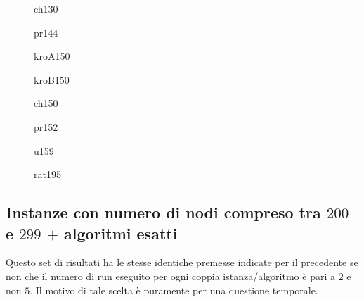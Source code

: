 \documentclass[11pt]{article}
\begin{document}
\begin{figure}[htbp]
\centering
{}
\label{fig:ch130}
\caption{ch130}
\end{figure}

\begin{figure}[htbp]
\centering
{}
\label{fig:pr144}
\caption{pr144}
\end{figure}

\begin{figure}[htbp]
\centering
{}
\label{fig:kroA150}
\caption{kroA150}
\end{figure}

\begin{figure}[htbp]
\centering
{}
\label{fig:kroB150}
\caption{kroB150}
\end{figure}

\begin{figure}[htbp]
\centering
{}
\label{fig:ch150}
\caption{ch150}
\end{figure}

\begin{figure}[htbp]
\centering
{}
\label{fig:pr152}
\caption{pr152}
\end{figure}

\begin{figure}[htbp]
\centering
{}
\label{fig:u159}
\caption{u159}
\end{figure}

\begin{figure}[htbp]
\centering
{}
\label{fig:rat195}
\caption{rat195}
\end{figure}

\FloatBarrier

\subsection*{Instanze con numero di nodi compreso tra \textbf{$200$} e \textbf{$299$} $+$ algoritmi esatti}

Questo set di risultati ha le stesse identiche premesse indicate per il precedente se non che il numero di run eseguito per ogni coppia istanza/algoritmo è pari a $2$ e non $5$. Il motivo di tale scelta è puramente per una questione temporale.
\end{document}
